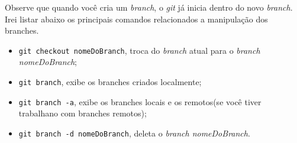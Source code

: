 \documentclass[12pt,openright,oneside,a4paper,english,brazil]{abntex2}
\begin{document}
Observe que quando você cria um \textit{branch}, o \textit{git} já inicia dentro do novo \textit{branch}. Irei listar abaixo os principais comandos relacionados a manipulação dos branches.

\begin{itemize}
	\item \verb|git checkout nomeDoBranch|, troca do \textit{branch} atual para o \textit{branch nomeDoBranch};
	\item \verb|git branch|, exibe os branches criados localmente;
	\item \verb|git branch -a|, exibe os branches locais e os remotos(se você tiver trabalhano com branches remotos);
	\item \verb|git branch -d nomeDoBranch|, deleta o \textit{branch nomeDoBranch}.
\end{itemize}

%
%
	 		
\end{document}
